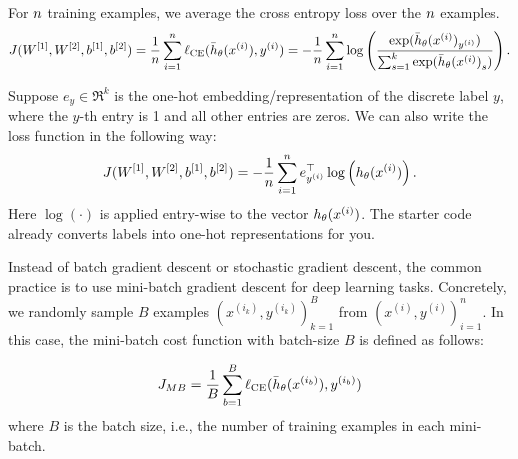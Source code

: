For ${n}$ training examples, we average the cross entropy loss over the ${n}$ examples.
  \begin{equation*}
  J(W^{[1]},W^{[2]},b^{[1]},b^{[2]}) = \frac{1}{{n}}\sum_{i=1}^{n} \ell_\textup{CE}(\bar{h}_{\theta}(x^{(i)}),y^{(i)})  = - \frac{1}{{n}}\sum_{i=1}^{n} \log\left(\frac{\exp(\bar{h}_{\theta}(x^{(i)})_{y^{(i)}})}{\sum_{s=1}^{k}\exp({\bar{h}_{\theta}(x^{(i)})}_s)}\right).
  \end{equation*}

Suppose $e_y\in \Re^k$ is the one-hot embedding/representation of the discrete label $y$, where the $y$-th entry is 1 and all other entries are zeros. We can also write the loss function in the following way:
  \begin{equation*}
  J(W^{[1]},W^{[2]},b^{[1]},b^{[2]}) = - \frac{1}{{n}}\sum_{i=1}^{n} e_{y^{(i)}}^\top\log\left(h_\theta(x^{(i)})\right).
  \end{equation*}
Here $\log(\cdot)$ is applied entry-wise to the vector $h_\theta(x^{(i)})$. 
The starter code already converts labels into one-hot representations for you.


Instead of batch gradient descent or stochastic gradient descent, the common practice
is to use mini-batch gradient descent for deep learning tasks. Concretely, we randomly sample $B$ examples $(x^{(i_k)}, y^{(i_k)})_{k=1}^B$ from $(x^{(i)}, y^{(i)})_{i=1}^n$. In this case, the
mini-batch cost function with batch-size $B$ is defined as follows:

  \begin{equation*}
  J_{MB} = \frac{1}{B}\sum_{b=1}^B \ell_\textup{CE}(\bar{h}_{\theta}(x^{(i_b)}),y^{(i_b)})
  \end{equation*}
where $B$ is the batch size, i.e., the number of training examples in each mini-batch. 

\begin{enumerate}
  

\ifnum{} {
  
} \fi

  

\ifnum{} {
  
} \fi

  

\ifnum{} {
  
} \fi


  
\ifnum{} {
  
} \fi

 \end{enumerate}

